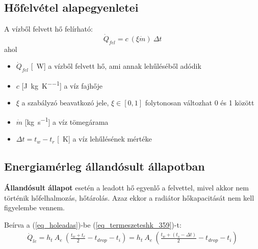 %
%
%
%
\subsection{Hőfelvétel alapegyenletei}
A vízből felvett hő felírható:
\begin{equation} \label{eq_hofelvetel}
\dot Q_{fel} = c ~ (\xi\dot{m}) ~ \Delta t
\end{equation}
ahol
\begin{itemize}[itemsep=6pt,topsep=0pt,parsep=0pt,partopsep=0pt]
	\item[] $\dot{Q}_{fel}$ [\SI{}{\watt}] a vízből felvett hő, ami annak lehűléséből adódik
	\item[] $c$ [\si[per-mode = fraction]{\joule\per\kg\per\kelvin}] a víz fajhője
	\item[] $\xi$ a szabályzó beavatkozó jele, $ \xi \in [0,1]$ folytonosan változhat 0 és 1 között
	\item[] $\dot{m}$ [\si[per-mode = fraction]{\kg\per\second}] a víz tömegárama
	\item[] $\Delta t = t_w-t_r$ [\SI{}{\kelvin}] a víz lehűlésének mértéke
\end{itemize}

\subsection{Energiamérleg állandósult állapotban}
\textbf{Állandósult állapot} esetén a leadott hő egyenlő a felvettel, mivel akkor nem történik hőfelhalmozás, hőtárolás.
Azaz ekkor a radiátor hőkapacitását nem kell figyelembe vennem.

Beírva a (\ref{eq_holeadas})-be (\ref{eq_termeszeteshk_359})-t:
\begin{equation} \label{eq_holeadas2}
\begin{aligned}
\dot Q_{le} = h_t ~ A_e ~ \left( \frac{t_w+t_r}{2}-t_{drop} - t_i\right) = h_t ~ A_e ~ \left( \frac{t_w+(t_s-\Delta t)}{2}-t_{drop}-t_i\right)
\end{aligned}
\end{equation}

